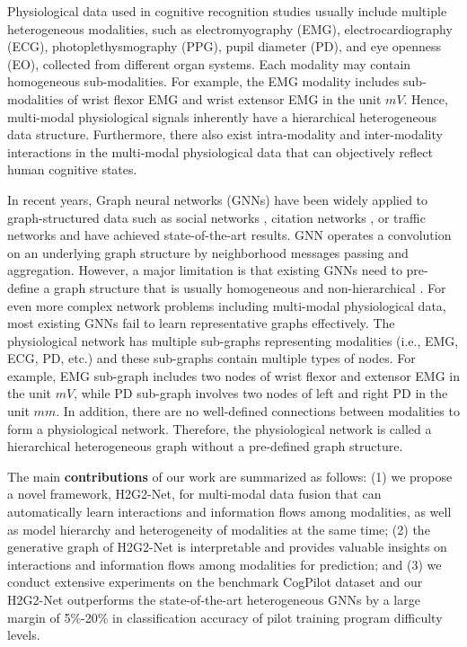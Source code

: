 \documentclass[letterpaper]{article} %
\begin{document}
Physiological data used in cognitive recognition studies usually include multiple heterogeneous modalities, such as electromyography (EMG), electrocardiography (ECG), photoplethysmography (PPG), pupil diameter (PD), and eye openness (EO), collected from different organ systems. Each modality may contain homogeneous sub-modalities. For example, the EMG modality includes sub-modalities of wrist flexor EMG and wrist extensor EMG in the unit $mV$. Hence, multi-modal physiological signals inherently have a hierarchical heterogeneous data structure. Furthermore, there also exist intra-modality and inter-modality interactions in the multi-modal physiological data that can objectively reflect human cognitive states.

In recent years, Graph neural networks (GNNs) have been widely applied to graph-structured data such as social networks \cite{chen2018fastgcn, hamilton2017inductive, wang2016structural}, citation networks \cite{kipf2016semi, velivckovic2017graph}, or traffic networks \cite{mo2021heterogeneous} and have achieved state-of-the-art results. GNN operates a convolution on an underlying graph structure by neighborhood messages passing and aggregation. However, a major limitation is that existing GNNs need to pre-define a graph structure that is usually homogeneous and non-hierarchical \cite{kipf2016semi, hamilton2017inductive, velivckovic2017graph}. For even more complex network problems including multi-modal physiological data, most existing GNNs fail to learn representative graphs effectively. The physiological network has multiple sub-graphs representing modalities (i.e., EMG, ECG, PD, etc.) and these sub-graphs contain multiple types of nodes. For example, EMG sub-graph includes two nodes of wrist flexor and extensor EMG in the unit $mV$, while PD sub-graph involves two nodes of left and right PD in the unit $mm$. In addition, there are no well-defined connections between modalities to form a physiological network. Therefore, the physiological network is called a hierarchical heterogeneous graph without a pre-defined graph structure.

The main \textbf{contributions} of our work are summarized as follows: (1) we propose a novel framework, H2G2-Net, for multi-modal data fusion that can automatically learn interactions and information flows among modalities, as well as model hierarchy and heterogeneity of modalities at the same time; (2) the generative graph of H2G2-Net is interpretable and provides valuable insights on interactions and information flows among modalities for prediction; and (3) we conduct extensive experiments on the benchmark CogPilot dataset and our H2G2-Net outperforms the state-of-the-art heterogeneous GNNs by a large margin of 5\%-20\% in classification accuracy of pilot training program difficulty levels.
\end{document}
